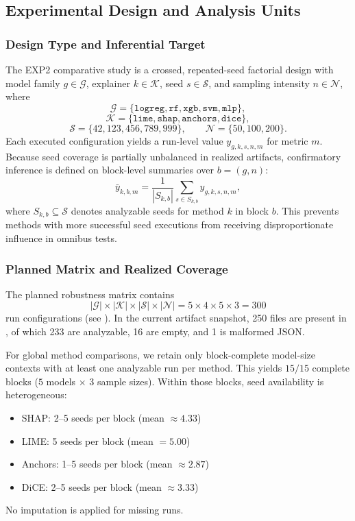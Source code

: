 \documentclass[twoside,11pt]{article}
\begin{document}
\subsection{Experimental Design and Analysis Units}
\subsubsection{Design Type and Inferential Target}
The EXP2 comparative study is a crossed, repeated-seed factorial design with
model family $g \in \mathcal{G}$, explainer $k \in \mathcal{K}$, seed
$s \in \mathcal{S}$, and sampling intensity $n \in \mathcal{N}$, where
\[
\mathcal{G}=\{\texttt{logreg},\texttt{rf},\texttt{xgb},\texttt{svm},\texttt{mlp}\},
\]
\[
\mathcal{K}=\{\texttt{lime},\texttt{shap},\texttt{anchors},\texttt{dice}\},
\]
\[
\mathcal{S}=\{42,123,456,789,999\}, \qquad
\mathcal{N}=\{50,100,200\}.
\]
Each executed configuration yields a run-level value $y_{g,k,s,n,m}$ for metric
$m$. Because seed coverage is partially unbalanced in realized artifacts,
confirmatory inference is defined on block-level summaries over
$b=(g,n)$:
\[
\bar{y}_{k,b,m}=\frac{1}{|S_{k,b}|}\sum_{s \in S_{k,b}} y_{g,k,s,n,m},
\]
where $S_{k,b}\subseteq\mathcal{S}$ denotes analyzable seeds for method $k$ in
block $b$. This prevents methods with more successful seed executions from
receiving disproportionate influence in omnibus tests.

\subsubsection{Planned Matrix and Realized Coverage}
The planned robustness matrix contains
\[
|\mathcal{G}|\times|\mathcal{K}|\times|\mathcal{S}|\times|\mathcal{N}|
=5\times4\times5\times3=300
\]
run configurations (see
). In the current artifact
snapshot, 250 files are present in
, of which 233 are analyzable,
16 are empty, and 1 is malformed JSON.

For global method comparisons, we retain only block-complete model-size
contexts with at least one analyzable run per method. This yields $15/15$
complete blocks ($5$ models $\times$ $3$ sample sizes). Within those blocks,
seed availability is heterogeneous:
\begin{itemize}[leftmargin=*]
    \item SHAP: 2--5 seeds per block (mean $\approx 4.33$)
    \item LIME: 5 seeds per block (mean $=5.00$)
    \item Anchors: 1--5 seeds per block (mean $\approx 2.87$)
    \item DiCE: 2--5 seeds per block (mean $\approx 3.33$)
\end{itemize}
No imputation is applied for missing runs.
\end{document}
